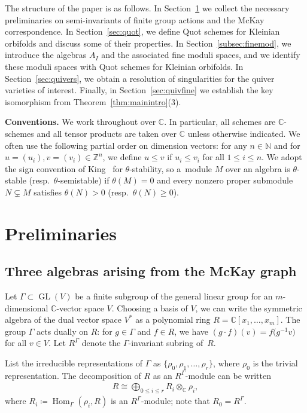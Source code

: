 \documentclass[pdftex]{sigma}%
\newcommand{\SC}{\mathbb{C}} %
\newcommand{\GL}{\operatorname{GL}}
\newcommand{\Hom}{\operatorname{Hom}}
\numberwithin{equation}{section}
\begin{document}
The structure of the paper is as follows. In Section~\ref{sec:prelim} we collect
the necessary preliminaries on semi-invariants of finite group actions and the McKay correspondence. In Section~\ref{sec:quot}, we define Quot schemes for Kleinian orbifolds and discuss some of their properties. In Section~\ref{subsec:finemod}, we introduce the algebras $A_I$
and the associated fine moduli spaces, and we identify these moduli spaces with Quot schemes for Kleinian orbifolds. In Section~\ref{sec:quivers},
we obtain a resolution of singularities for the quiver varieties of interest.
Finally, in Section~\ref{sec:quivfine} we establish the key isomorphism from Theorem~\ref{thm:mainintro}(3).

\medskip

\noindent
\textbf{Conventions.}
 We work throughout over $\SC$. In particular, all schemes are $\SC$-schemes and all tensor products are taken over $\SC$ unless otherwise indicated. We often use the following partial order on dimension vectors: for any $n\in \mathbb{N}$ and for $u=(u_i),v=(v_i)\in \mathbb{Z}^n$, we define $u\le v$ if $u_i\le v_i$ for all $1\leq i\leq n$. We adopt the sign convention of King~\cite{king1994moduli} for $\theta$-stability, so a~module $M$ over an algebra is $\theta$-stable (resp.\ $\theta$-semistable) if $\theta(M)=0$ and every nonzero proper submodule $N\subsetneq M$ satisfies $\theta(N)>0$ (resp.\ $\theta(N)\ge 0$).

\section{Preliminaries}\label{sec:prelim}

\subsection{Three algebras arising from the McKay graph}\label{subsec:mckay}
Let $\Gamma\subset \GL(V)$ be a finite subgroup of the general linear group for an $m$-dimensional $\SC$-vector space $V$.
Choosing a basis of $V$, we can write the symmetric algebra of the dual vector space $V^*$ as a polynomial ring $R=\SC[x_1,\dots,x_m]$. The group $\Gamma$ acts dually on $R$: for $g\in \Gamma$ and $f\in R$, we have $(g\cdot f)(v) = f\big(g^{-1} v\big)$ for all $v\in V$. Let $R^\Gamma$ denote the $\Gamma$-invariant subring of~$R$.

List the irreducible representations of $\Gamma$ as $\{\rho_0, \rho_1, \dots, \rho_r\}$, where $\rho_0$ is the trivial representation.
The decomposition of $R$ as an $R^\Gamma$-module can be written \cite[Proposition~4.1.15]{goodman2009symmetry}
 \begin{gather*} %
 R\cong \bigoplus_{0\leq i\leq r} R_i\otimes_\mathbb{C} \rho_i,
 \end{gather*}
 where $R_i\coloneqq \Hom_\Gamma(\rho_i,R)$ is an
 $R^\Gamma$-module; note that $R_0=R^{\Gamma}$.
\end{document}
